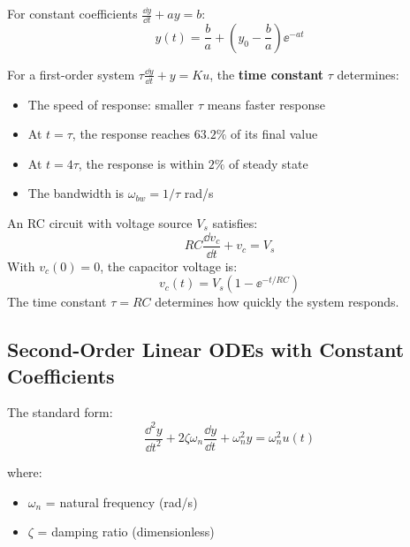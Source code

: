 For constant coefficients $\frac{\dd y}{\dd t} + ay = b$:
\begin{equation}
y(t) = \frac{b}{a} + \left(y_0 - \frac{b}{a}\right)\ee^{-at}
\end{equation}

\begin{keyconceptbox}[title=Time Constant]
For a first-order system $\tau \frac{\dd y}{\dd t} + y = Ku$, the \textbf{time constant} $\tau$ determines:
\begin{itemize}
    \item The speed of response: smaller $\tau$ means faster response
    \item At $t = \tau$, the response reaches $63.2\%$ of its final value
    \item At $t = 4\tau$, the response is within $2\%$ of steady state
    \item The bandwidth is $\omega_{bw} = 1/\tau$ rad/s
\end{itemize}
\end{keyconceptbox}

\begin{examplebox}[title=Example: RC Circuit]
An RC circuit with voltage source $V_s$ satisfies:
\begin{equation}
RC\frac{\dd v_c}{\dd t} + v_c = V_s
\end{equation}
With $v_c(0) = 0$, the capacitor voltage is:
\begin{equation}
v_c(t) = V_s\left(1 - \ee^{-t/RC}\right)
\end{equation}
The time constant $\tau = RC$ determines how quickly the system responds.
\end{examplebox}



\subsection{Second-Order Linear ODEs with Constant Coefficients}

The standard form:
\begin{equation}
\frac{\dd^2 y}{\dd t^2} + 2\zeta\omega_n\frac{\dd y}{\dd t} + \omega_n^2 y = \omega_n^2 u(t)
\end{equation}

where:
\begin{itemize}
    \item $\omega_n$ = natural frequency (rad/s)
    \item $\zeta$ = damping ratio (dimensionless)
\end{itemize}

